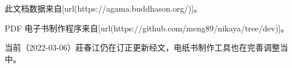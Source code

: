 此文档数据来自[url(https://agama.buddhason.org/)]。

PDF 电子书制作程序来自[url(https://github.com/meng89/nikaya/tree/dev)]。

当前（2022-03-06）莊春江仍在订正更新经文，电纸书制作工具也在完善调整当中。